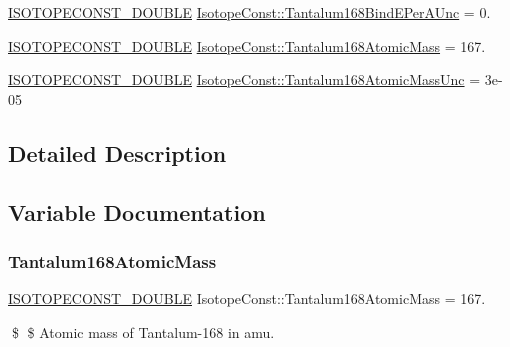 \begin{DoxyCompactItemize}
\mbox{\hyperlink{group___isotope_const-_macros_ga8f45a7272ce02c0b4c65c44636ed719a}{I\+S\+O\+T\+O\+P\+E\+C\+O\+N\+S\+T\+\_\+\+D\+O\+U\+B\+LE}} \mbox{\hyperlink{group___isotope_const-_tantalum-_ta168_ga353f1cd314f0cc45e75d75c63b524229}{Isotope\+Const\+::\+Tantalum168\+Bind\+E\+Per\+A\+Unc}} = 0.
\item 
\mbox{\hyperlink{group___isotope_const-_macros_ga8f45a7272ce02c0b4c65c44636ed719a}{I\+S\+O\+T\+O\+P\+E\+C\+O\+N\+S\+T\+\_\+\+D\+O\+U\+B\+LE}} \mbox{\hyperlink{group___isotope_const-_tantalum-_ta168_gabb6a63047d873a89d70d6963d70262bc}{Isotope\+Const\+::\+Tantalum168\+Atomic\+Mass}} = 167.
\item 
\mbox{\hyperlink{group___isotope_const-_macros_ga8f45a7272ce02c0b4c65c44636ed719a}{I\+S\+O\+T\+O\+P\+E\+C\+O\+N\+S\+T\+\_\+\+D\+O\+U\+B\+LE}} \mbox{\hyperlink{group___isotope_const-_tantalum-_ta168_gaecefdb116a7043993569aa658c35ab81}{Isotope\+Const\+::\+Tantalum168\+Atomic\+Mass\+Unc}} = 3e-\/05
\end{DoxyCompactItemize}


\subsection{Detailed Description}


\subsection{Variable Documentation}
\mbox{\label{group___isotope_const-_tantalum-_ta168_gabb6a63047d873a89d70d6963d70262bc}} 
\subsubsection{\texorpdfstring{Tantalum168\+Atomic\+Mass}{Tantalum168AtomicMass}}
{\footnotesize\ttfamily \mbox{\hyperlink{group___isotope_const-_macros_ga8f45a7272ce02c0b4c65c44636ed719a}{I\+S\+O\+T\+O\+P\+E\+C\+O\+N\+S\+T\+\_\+\+D\+O\+U\+B\+LE}} Isotope\+Const\+::\+Tantalum168\+Atomic\+Mass = 167.}

\$ \$ Atomic mass of Tantalum-\/168 in amu. \mbox{\label{group___isotope_const-_tantalum-_ta168_gaecefdb116a7043993569aa658c35ab81}} 
